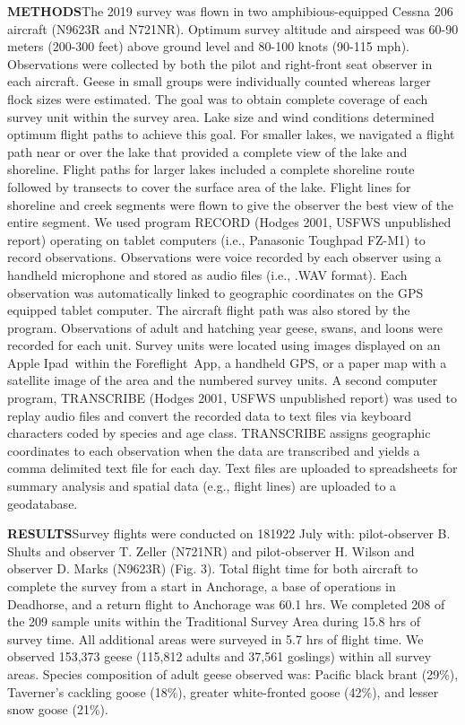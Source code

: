 \documentclass[
]{article}
\begin{document}
\textbf{METHODS}\break The 2019 survey was flown in two
amphibious-equipped Cessna 206 aircraft (N9623R and N721NR). Optimum
survey altitude and airspeed was 60-90 meters (200-300 feet) above
ground level and 80-100 knots (90-115 mph). Observations were collected
by both the pilot and right-front seat observer in each aircraft. Geese
in small groups were individually counted whereas larger flock sizes
were estimated. The goal was to obtain complete coverage of each survey
unit within the survey area. Lake size and wind conditions determined
optimum flight paths to achieve this goal. For smaller lakes, we
navigated a flight path near or over the lake that provided a complete
view of the lake and shoreline. Flight paths for larger lakes included a
complete shoreline route followed by transects to cover the surface area
of the lake. Flight lines for shoreline and creek segments were flown to
give the observer the best view of the entire segment. We used program
RECORD (Hodges 2001, USFWS unpublished report) operating on tablet
computers (i.e., Panasonic Toughpad FZ-M1\texttrademark) to record
observations. Observations were voice recorded by each observer using a
handheld microphone and stored as audio files (i.e., .WAV format). Each
observation was automatically linked to geographic coordinates on the
GPS equipped tablet computer. The aircraft flight path was also stored
by the program. Observations of adult and hatching year geese, swans,
and loons were recorded for each unit. Survey units were located using
images displayed on an Apple Ipad\texttrademark~within the
Foreflight\texttrademark~App, a handheld GPS, or a paper map with a
satellite image of the area and the numbered survey units. A second
computer program, TRANSCRIBE (Hodges 2001, USFWS unpublished report) was
used to replay audio files and convert the recorded data to text files
via keyboard characters coded by species and age class. TRANSCRIBE
assigns geographic coordinates to each observation when the data are
transcribed and yields a comma delimited text file for each day. Text
files are uploaded to spreadsheets for summary analysis and spatial data
(e.g., flight lines) are uploaded to a geodatabase.

\setlength{\parskip}{4ex}

\textbf{RESULTS}\newline Survey flights were conducted on 181922 July
with: pilot-observer B. Shults and observer T. Zeller (N721NR) and
pilot-observer H. Wilson and observer D. Marks (N9623R) (Fig. 3). Total
flight time for both aircraft to complete the survey from a start in
Anchorage, a base of operations in Deadhorse, and a return flight to
Anchorage was 60.1 hrs. We completed 208 of the 209 sample units within
the Traditional Survey Area during 15.8 hrs of survey time. All
additional areas were surveyed in 5.7 hrs of flight time. We observed
153,373 geese (115,812 adults and 37,561 goslings) within all survey
areas. Species composition of adult geese observed was: Pacific black
brant (29\%), Taverner's cackling goose (18\%), greater white-fronted
goose (42\%), and lesser snow goose (21\%).
\end{document}
